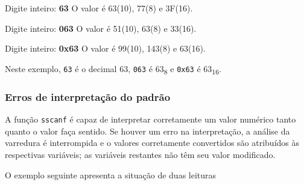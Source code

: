 \documentclass[
  11pt,
  a4paper,
]{scrbook}
\newenvironment{Shaded}{\begin{snugshade}}{\end{snugshade}}
\newcommand{\KeywordTok}[1]{\textcolor[rgb]{0.13,0.29,0.53}{\textbf{#1}}}
\newcommand{\NormalTok}[1]{#1}
\begin{document}
\begin{Shaded}
\begin{Highlighting}[]
\NormalTok{Digite inteiro: }\KeywordTok{ 63 }
\NormalTok{O valor é 63(10), 77(8) e 3F(16).}

\NormalTok{Digite inteiro: }\KeywordTok{ 063 }
\NormalTok{O valor é 51(10), 63(8) e 33(16).}

\NormalTok{Digite inteiro: }\KeywordTok{ 0x63 }
\NormalTok{O valor é 99(10), 143(8) e 63(16).}
\end{Highlighting}
\end{Shaded}

Neste exemplo, \texttt{63} é o decimal 63, \texttt{063} é
63\textsubscript{8} e \texttt{0x63} é 63\textsubscript{16}.

\subsubsection{Erros de interpretação do
padrão}\label{erros-de-interpretauxe7uxe3o-do-padruxe3o}

A função \texttt{sscanf} é capaz de interpretar corretamente um valor
numérico tanto quanto o valor faça sentido. Se houver um erro na
interpretação, a análise da varredura é interrompida e o valores
corretamente convertidos são atribuídos às respectivas variáveis; as
variáveis restantes não têm seu valor modificado.

O exemplo seguinte apresenta a situação de duas leituras
\end{document}
